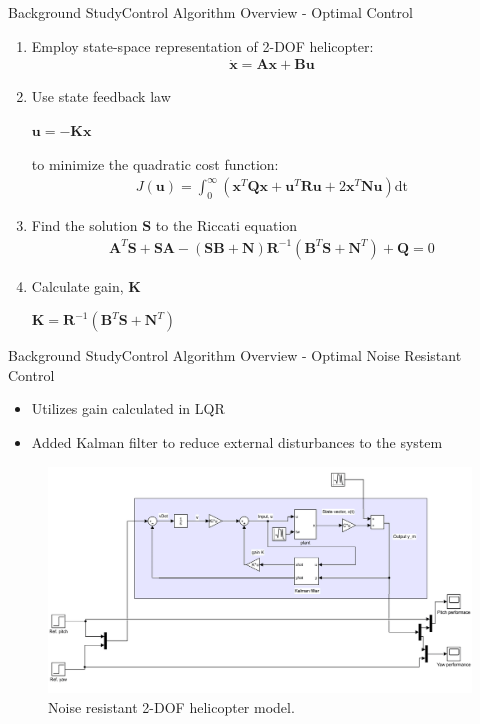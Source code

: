 \documentclass{beamer}
\begin{document}
\begin{frame}{Background Study}{Control Algorithm Overview - Optimal Control}
\begin{enumerate}
    \item Employ state-space representation of 2-DOF helicopter:
    \begin{align*}
        \dot{\mathbf{x}} = \mathbf{A}\mathbf{x} + \mathbf{B}\mathbf{u}
    \end{align*}
    \item Use state feedback law
    \begin{center}
        $\mathbf{u} = -\mathbf{K}\mathbf{x}$
    \end{center}
    to minimize the quadratic cost function:
    \begin{align*}
        J(\mathbf{u}) = \int_0^\infty (\mathbf{x}^T\mathbf{Q}\mathbf{x} + \mathbf{u}^T\mathbf{R}\mathbf{u} + 2\mathbf{x}^T\mathbf{N}\mathbf{u})\mathrm{dt}
    \end{align*}
    \item Find the solution $\mathbf{S}$ to the Riccati equation
    \begin{align*}
        \mathbf{A}^T\mathbf{S}+\mathbf{SA}-(\mathbf{SB}+\mathbf{N})\mathbf{R}^{-1}(\mathbf{B}^T\mathbf{S}+\mathbf{N}^T)+\mathbf{Q}=0
    \end{align*}    
    \item Calculate gain, $\mathbf{K}$
    \begin{center}
        $\mathbf{K}=\mathbf{R}^{-1}(\mathbf{B}^T\mathbf{S}+\mathbf{N}^T)$
    \end{center}
\end{enumerate}
\end{frame}
\begin{frame}{Background Study}{Control Algorithm Overview - Optimal Noise Resistant Control}
\begin{itemize}
    \item Utilizes gain calculated in LQR
    \item Added Kalman filter to reduce external disturbances to the system
\end{itemize} 
\begin{figure}
    \centering
    \includegraphics[width=.8\textwidth,keepaspectratio=true]{figs/img/LQG_SimulinkResize.png}
    \caption{Noise resistant 2-DOF helicopter model.}
    \label{fig:LQGModel}
\end{figure}
\end{frame}
\end{document}
